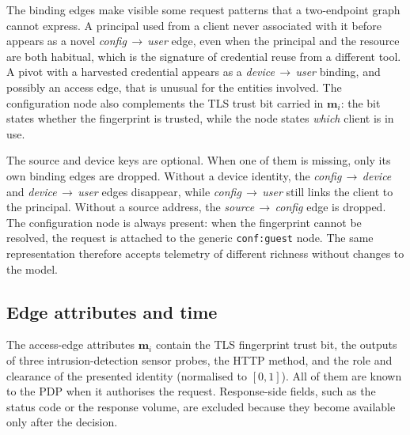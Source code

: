 The binding edges make visible some request patterns that a two-endpoint graph cannot
express. A principal used from a client never associated with it before appears as a
novel \textit{config}\,$\rightarrow$\,\textit{user} edge, even when the principal and
the resource are both habitual, which is the signature of credential reuse from a
different tool. A pivot with a harvested credential appears as a
\textit{device}\,$\rightarrow$\,\textit{user} binding, and possibly an access edge, that
is unusual for the entities involved. The configuration node also complements the TLS
trust bit carried in $\mathbf{m}_i$: the bit states whether the fingerprint is trusted,
while the node states \emph{which} client is in use.

The source and device keys are optional. When one of them is missing, only its own
binding edges are dropped. Without a device identity, the
\textit{config}\,$\rightarrow$\,\textit{device} and
\textit{device}\,$\rightarrow$\,\textit{user} edges disappear, while
\textit{config}\,$\rightarrow$\,\textit{user} still links the client to the principal.
Without a source address, the \textit{source}\,$\rightarrow$\,\textit{config} edge is
dropped. The configuration node is always present: when the fingerprint cannot be
resolved, the request is attached to the generic \texttt{conf:guest} node. The same
representation therefore accepts telemetry of different richness without changes to the
model.

\subsection{Edge attributes and time}
\label{sec:tgr-attr}

The access-edge attributes $\mathbf{m}_i$ contain the TLS fingerprint trust bit, the
outputs of three intrusion-detection sensor probes, the HTTP method, and the role and
clearance of the presented identity (normalised to $[0,1]$).
All of them are known to the PDP when it authorises the request. Response-side fields,
such as the status code or the response volume, are excluded because they become
available only after the decision.

